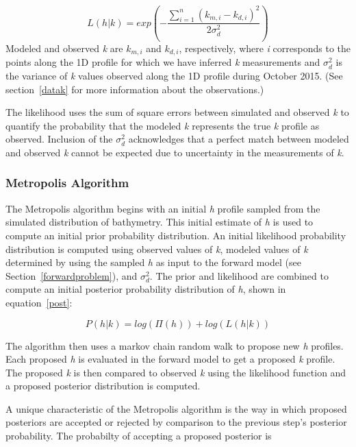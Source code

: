 \begin{equation} \label{likely}
L(h|%
k)=exp(- \frac{\sum\limits_{i=1}^n({k}_{m,i}-k_{d,i})^2}{2\sigma_{d}^2})
\end{equation} 
Modeled and observed \textit{k} are ${k}_{m,i}$ and $k_{d,i}$, respectively, where \textit{i} corresponds to the points along the 1D profile for which we have inferred \textit{k} measurements and $\sigma_{d}^2$ is the variance of \textit{k} values observed along the 1D profile during October 2015. (See section~\ref{datak} for more information about the observations.) 

The likelihood uses the sum of square errors between simulated and observed \textit{k} to quantify the probability that the modeled \textit{k} represents the true \textit{k} profile as observed. Inclusion of the $\sigma_{d}^2$ acknowledges that a perfect match between modeled and observed \textit{k} cannot be expected due to uncertainty in the measurements of \textit{k}.

\subsubsection{Metropolis Algorithm}
The Metropolis algorithm begins with an initial \textit{h} profile sampled from the simulated distribution of bathymetry. This initial estimate of \textit{h} is used to compute an initial prior probability distribution. An initial likelihood probability distribution is computed using observed values of \textit{k}, modeled values of \textit{k} determined by using the sampled \textit{h} as input to the forward model (see Section~\ref{forwardproblem}), and $\sigma_{d}^2$. The prior and likelihood are combined to compute an initial posterior probability distribution of \textit{h}, shown in equation~\ref{post}:

\begin{equation}\label{post}
P(h|%
k) = log(\Pi(h)) + log(L(h|%
k))
\end{equation}

The algorithm then uses a markov chain random walk to propose new \textit{h} profiles. Each proposed \textit{h} is evaluated in the forward model to get a proposed \textit{k} profile. The proposed \textit{k} is then compared to observed \textit{k} using the likelihood function and a proposed posterior distribution is computed.

A unique characteristic of the Metropolis algorithm is the way in which proposed posteriors are accepted or rejected by comparison to the previous step's posterior probability. The probabilty of accepting a proposed posterior is 

